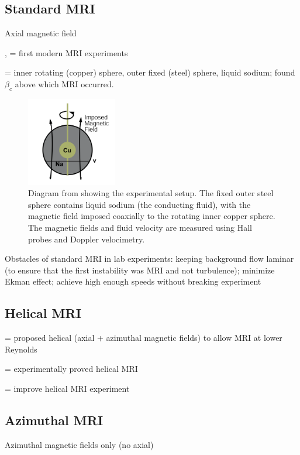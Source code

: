 \documentclass{jfm}
\begin{document}
%
%
\subsection{Standard MRI}
Axial magnetic field

\cite{Ji2001}, \cite{Ji2002} = first modern MRI experiments

\cite{Sisan2004} = inner rotating (copper) sphere, outer fixed (steel) sphere, 
liquid sodium; found $\beta_c$ above which MRI occurred.

\begin{figure}[t]
    \centering
    \includegraphics[width=0.35\textwidth]{Sisan2004_diagram}
    \caption{Diagram from \cite{Sisan2004} showing the experimental setup. The fixed outer steel sphere contains liquid sodium (the conducting fluid), with the magnetic field imposed coaxially to the rotating inner copper sphere. The magnetic fields and fluid velocity are measured using Hall probes and Doppler velocimetry.}
\end{figure}


Obstacles of standard MRI in lab experiments: keeping background flow laminar 
(to ensure that the first instability was MRI and not turbulence); minimize 
Ekman effect; achieve high enough speeds without breaking experiment


%
%
\subsection{Helical MRI}

\cite{Hollerbach2005} = proposed helical (axial + azimuthal magnetic fields) 
to allow MRI at lower Reynolds

\cite{Stefani2006, Stefani2007}  = experimentally proved helical MRI

\cite{Stefani2009} = improve helical MRI experiment


%
%
\subsection{Azimuthal MRI}
Azimuthal magnetic fields only (no axial)
\end{document}

